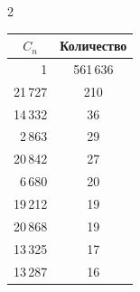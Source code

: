 \begin{multicols}{2}
\begin{center}
\vspace*{6pt}



{\small   


\begin{tabular}{|r|c|}

   \hline

\multicolumn{1}{|c|}{$C_n$}&\multicolumn{1}{c|}{Количество}\\

\hline

1&561\,636\hphantom{9999}\\

21\,727&210\hphantom{9}\\

14\,332&36\\

\hphantom{9}2\,863&29\\

20\,842&27\\

\hphantom{9}6\,680&20\\

19\,212&19\\

20\,868&19\\

13\,325&17\\

13\,287&16\\

\hline

\end{tabular}

}

\end{center}






\addtocounter{table}{1}



   

   







\begin{figure}[b] %

\vspace*{-6pt}

\vspace*{9pt}


\end{figure}
\end{multicols}
